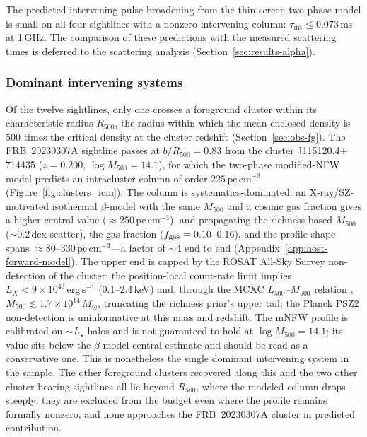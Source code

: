 The predicted intervening pulse broadening from the thin-screen two-phase
model is small on all four sightlines with a nonzero intervening column:
$\tau_{\mathrm{int}} \le 0.073$\,ms at 1\,GHz. The comparison of these
predictions with
the measured scattering times is deferred to the scattering analysis
(Section~\ref{sec:results-alpha}).




\subsubsection{Dominant intervening systems}
\label{sec:dominant-systems}

Of the twelve sightlines, only one crosses a foreground cluster within its
characteristic radius $R_{500}$, the radius within which the mean enclosed
density is 500 times the critical density at the cluster redshift
(Section~\ref{sec:obs-fg}). The FRB~20230307A sightline passes at $b/R_{500}=0.83$
from the \citet{WenHan2024} cluster J115120.4$+$714435 ($z=0.200$,
$\log M_{500}=14.1$), for which the two-phase modified-NFW model predicts an
intracluster column of order $225\,\mathrm{pc\,cm^{-3}}$
(Figure~\ref{fig:clusters_icm}). The column is systematics-dominated: an
X-ray/SZ-motivated isothermal $\beta$-model with the same $M_{500}$
and a cosmic gas fraction gives a higher central value
($\approx250\,\mathrm{pc\,cm^{-3}}$), and propagating the richness-based
$M_{500}$ ($\sim\!0.2$\,dex scatter), the gas fraction ($f_{\rm gas}=0.10$--$0.16$),
and the profile shape spans $\approx80$--$330\,\mathrm{pc\,cm^{-3}}$---a
factor of $\sim$4 end to end (Appendix~\ref{app:host-forward-model}). The
upper end is capped by the ROSAT All-Sky Survey non-detection of the
cluster: the position-local count-rate limit implies
$L_X<9\times10^{43}\,\mathrm{erg\,s^{-1}}$ (0.1--2.4\,keV) and, through the
MCXC $L_{500}$--$M_{500}$ relation \citep{Piffaretti2011},
$M_{500}\lesssim1.7\times10^{14}\,M_\odot$, truncating the richness prior's
upper tail; the Planck PSZ2 non-detection is uninformative at this mass and
redshift. The mNFW profile is calibrated on
$\sim\!L_\star$ halos \citep{ProchaskaZheng2019} and is not guaranteed to hold at
$\log M_{500}=14.1$; its value sits below the $\beta$-model central estimate
and should be read as a conservative one. This is nonetheless the single
dominant intervening system in the sample. The other foreground clusters recovered along this and the two
other cluster-bearing sightlines all lie beyond $R_{500}$, where the modeled
column drops steeply; they are excluded from the budget even where the profile
remains formally nonzero, and none approaches the FRB~20230307A cluster in
predicted contribution.

